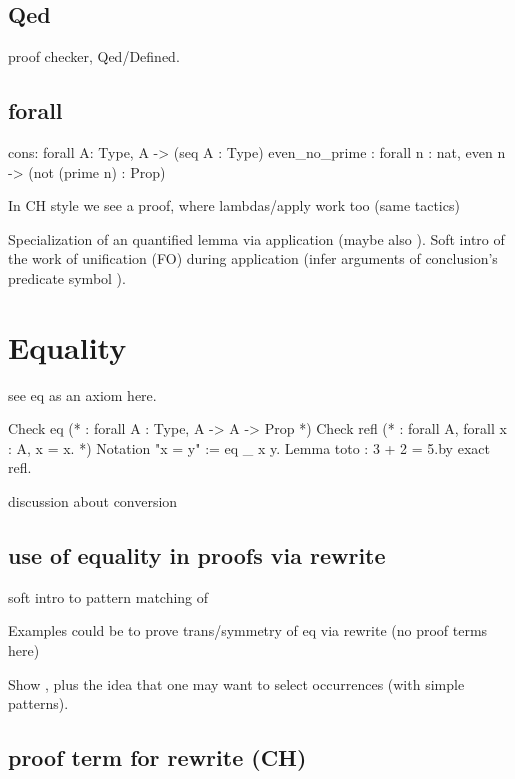 \subsection{Qed}

proof checker, Qed/Defined.

\subsection{forall}

\begin{coq}{}
cons: forall A: Type, A -> (seq A : Type)
even_no_prime : forall n : nat, even n -> (not (prime n) : Prop)
\end{coq}



In CH style we see a proof, where lambdas/apply work too (same tactics)

Specialization of an quantified lemma via application (maybe also
).
Soft intro of the work of unification (FO) during application (infer
arguments of conclusion's predicate symbol ).

\section{Equality}

see eq as an axiom here.

\begin{coq}{}
Check eq  (* : forall A : Type, A -> A -> Prop *)
Check refl (* : forall A, forall x : A, x = x. *)
Notation "x = y" := eq _ x y.
Lemma toto : 3 + 2 = 5.by exact refl.
\end{coq}

discussion about conversion

\subsection{use of equality in proofs via rewrite}

soft intro to pattern matching of \C{(_ + _)}

Examples could be to prove trans/symmetry of eq via rewrite (no proof terms
here)

Show , plus the idea that one may want to select
occurrences (with simple patterns).

\subsection{proof term for rewrite (CH)}

